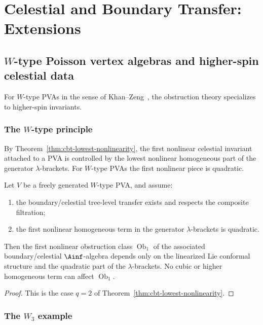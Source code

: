 \chapter{Celestial and Boundary Transfer: Extensions}
\label{ch:celestial-boundary-transfer-frontier}

\section{$W$-type Poisson vertex algebras and higher-spin celestial data}
\label{sec:cbt-w-type}

For $W$-type PVAs in the sense of Khan--Zeng~\cite{KZ25}, the obstruction theory specializes to higher-spin invariants.

\subsection{The $W$-type principle}
\label{sec:cbt-abstract-w-type}

By Theorem~\ref{thm:cbt-lowest-nonlinearity}, the first nonlinear celestial invariant attached to a PVA is controlled by the lowest nonlinear homogeneous part of the generator $\lambda$-brackets. For $W$-type PVAs the first nonlinear piece is quadratic.

\begin{corollary}
\label{cor:cbt-w-type-quadratic}
\ClaimStatusConditional
Let $V$ be a freely generated $W$-type PVA, and assume:
\begin{enumerate}[label=\textup{(\roman*)},leftmargin=2em]
\item the boundary/celestial tree-level transfer exists and respects the composite filtration;
\item the first nonlinear homogeneous term in the generator $\lambda$-brackets is quadratic.
\end{enumerate}
Then the first nonlinear obstruction class $\operatorname{Ob}_1$ of the associated boundary/celestial $\Ainf$-algebra depends only on the linearized Lie conformal structure and the quadratic part of the $\lambda$-brackets. No cubic or higher homogeneous term can affect $\operatorname{Ob}_1$.
\end{corollary}

\begin{proof}
This is the case $q=2$ of Theorem~\ref{thm:cbt-lowest-nonlinearity}.
\end{proof}

\subsection{The \texorpdfstring{$W_3$}{W3} example}
\label{sec:cbt-w3-example}

